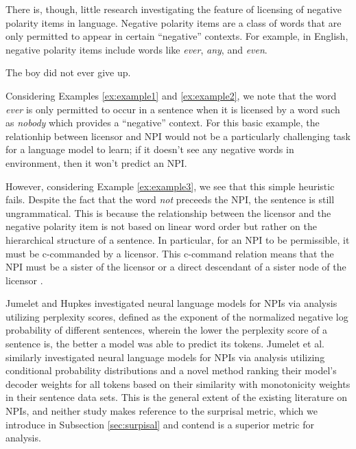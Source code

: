 \documentclass[11pt, round]{article}
\begin{document}
There is, though, little research investigating the feature of licensing of negative polarity items in language. Negative polarity items are a class of words that are only permitted to appear in certain ``negative'' contexts. For example, in English, negative polarity items include words like \textit{ever}, \textit{any}, and \textit{even}.
\begin{exe}
\ex \begin{xlist}
\ex \label{ex:example1} The boy did not ever give up.
\end{xlist}
\end{exe}
Considering Examples \ref{ex:example1} and \ref{ex:example2}, we note that the word \textit{ever} is only permitted to occur in a sentence when it is licensed by a word such as \textit{nobody} which provides a ``negative'' context. For this basic example, the relationhip between licensor and NPI would not be a particularly challenging task for a language model to learn; if it doesn't see any negative words in environment, then it won't predict an NPI. 

However, considering Example \ref{ex:example3}, we see that this simple heuristic fails. Despite the fact that the word \textit{not} preceeds the NPI, the sentence is still ungrammatical. This is because the relationship between the licensor and the negative polarity item is not based on linear word order but rather on the hierarchical structure of a sentence. In particular, for an NPI to be permissible, it must be c-commanded by a licensor. This c-command relation means that the NPI must be a sister of the licensor or a direct descendant of a sister node of the licensor \cite{ladusaw1980notion}.

Jumelet and Hupkes  investigated neural language models for NPIs via analysis utilizing perplexity scores, defined as the exponent of the normalized negative log probability of different sentences, wherein the lower the perplexity score of a sentence is, the better a model was able to predict its tokens. Jumelet et al.  similarly investigated neural language models for NPIs via analysis utilizing conditional probability distributions and a novel method ranking their model's decoder weights for all tokens based on their similarity with monotonicity weights in their sentence data sets. This is the general extent of the existing literature on NPIs, and neither study makes reference to the surprisal metric, which we introduce in Subsection \ref{sec:surpisal} and contend is a superior metric for analysis.
\end{document}
